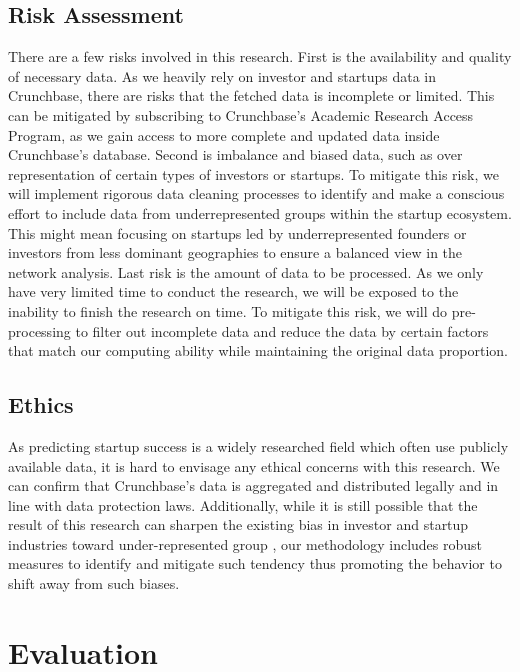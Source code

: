\documentclass[a4paper,11pt]{article}
\begin{document}
\subsection{Risk Assessment}
There are a few risks involved in this research. First is the availability and quality of necessary data. As we heavily rely on investor and startups data in Crunchbase, there are risks that the fetched data is incomplete or limited. This can be mitigated by subscribing to Crunchbase's Academic Research Access Program, as we gain access to more complete and updated data inside Crunchbase's database. Second is imbalance and biased data, such as over representation of certain types of investors or startups. To mitigate this risk, we will implement rigorous data cleaning processes to identify and make a conscious effort to include data from underrepresented groups within the startup ecosystem. This might mean focusing on startups led by underrepresented founders or investors from less dominant geographies to ensure a balanced view in the network analysis. Last risk is the amount of data to be processed. As we only have very limited time to conduct the research, we will be exposed to the inability to finish the research on time. To mitigate this risk, we will do pre-processing to filter out incomplete data and reduce the data by certain factors that match our computing ability while maintaining the original data proportion.

\subsection{Ethics}
As predicting startup success is a widely researched field which often use publicly available data, it is hard to envisage any ethical concerns with this research. We can confirm that Crunchbase's data is aggregated and distributed legally and in line with data protection laws. Additionally, while it is still possible that the result of this research can sharpen the existing bias in investor and startup industries toward under-represented group \cite{ewens2020a} \cite{cumming2007a}, our methodology includes robust measures to identify and mitigate such tendency thus promoting the behavior to shift away from such biases.


\section{Evaluation}
\end{document}
